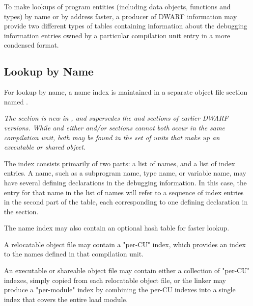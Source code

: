 To make lookups of program entities (including data objects, 
functions and types) by name or by address faster, a producer 
of DWARF information may provide two different types of tables
containing information about the debugging information
entries owned by a particular compilation unit entry in a
more condensed format.

\subsection{Lookup by Name}
For lookup by name, a name index is maintained in a separate
object file section named \dotdebugnames{}. 

\textit{The \dotdebugnames{} section is new in \DWARFVersionV,
and supersedes the \dotdebugpubnames{} and \dotdebugpubtypes{}
sections of earlier DWARF versions. While \dotdebugnames{} and
either \dotdebugpubnames{} and/or \dotdebugpubtypes{} sections
cannot both occur in the same compilation unit, both may be
found in the set of units that make up an executable or shared
object.}

The index consists
primarily of two parts: a list of names, and a list of index
entries. A name, such as a subprogram name, type name, or
variable name, may have several defining declarations in the
debugging information. In this case, the entry for that name in
the list of names will refer to a sequence of index entries in
the second part of the table, each corresponding to one defining
declaration in the \dotdebuginfo{} section.

The name index may also contain an optional hash table for faster
lookup.

\bb
A relocatable object file may contain a "per-CU" index, which
provides an index to the names defined in that compilation
unit.

An executable or shareable object file may contain either a collection of
"per-CU" indexes, simply copied from each relocatable object
file, or the linker may produce a "per-module" index by
combining the per-CU indexes into a single index that covers
the entire load module.
\eb

